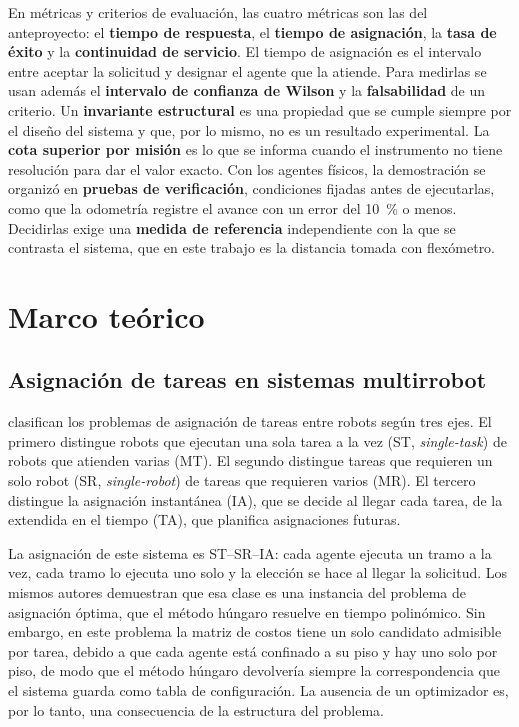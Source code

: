 En métricas y criterios de evaluación, las cuatro métricas son las del
anteproyecto: el \textbf{tiempo de respuesta}, el \textbf{tiempo de asignación}, la \textbf{tasa de éxito} y la
\textbf{continuidad de servicio}. El tiempo de asignación es el intervalo entre
aceptar la solicitud y designar el agente que la atiende. Para medirlas se usan
además el \textbf{intervalo de confianza de Wilson} y la \textbf{falsabilidad}
de un criterio. Un \textbf{invariante estructural} es una
propiedad que se cumple siempre por el diseño del sistema y que, por lo mismo, no es
un resultado experimental. La \textbf{cota superior por misión} es lo que se
informa cuando el instrumento no tiene resolución para dar el valor exacto. Con los agentes físicos, la demostración se organizó en \textbf{pruebas de
verificación}, condiciones fijadas antes de ejecutarlas, como
que la odometría registre el avance con un error del 10~\% o menos. Decidirlas
exige una \textbf{medida de referencia} independiente con la que se contrasta el sistema,
que en este trabajo es la distancia tomada con flexómetro.

\section{Marco teórico}
\label{sec:teorico}

\subsection{Asignación de tareas en sistemas multirrobot}
\label{sec:teo-asignacion}

\textcite{gerkey2004taxonomy} clasifican los problemas de asignación de tareas
entre robots según tres ejes. El primero distingue robots que ejecutan una sola
tarea a la vez (ST, \textit{single-task}) de robots que atienden varias (MT). El
segundo distingue tareas que requieren un solo robot (SR, \textit{single-robot})
de tareas que requieren varios (MR). El tercero distingue la asignación
instantánea (IA), que se decide al llegar cada tarea, de la extendida en el
tiempo (TA), que planifica asignaciones futuras.

La asignación de este sistema es ST--SR--IA: cada agente ejecuta un tramo a la vez, cada
tramo lo ejecuta uno solo y la elección se hace al llegar la solicitud. Los mismos autores
demuestran que esa clase es una instancia del problema de asignación óptima, que el método
húngaro resuelve en tiempo polinómico. Sin embargo, en este problema la matriz de costos tiene
un solo candidato admisible por tarea, debido a que cada agente está confinado a su piso y hay
uno solo por piso, de modo que el método húngaro devolvería siempre la correspondencia que el
sistema guarda como tabla de configuración. La ausencia de un optimizador es, por lo tanto, una
consecuencia de la estructura del problema.

